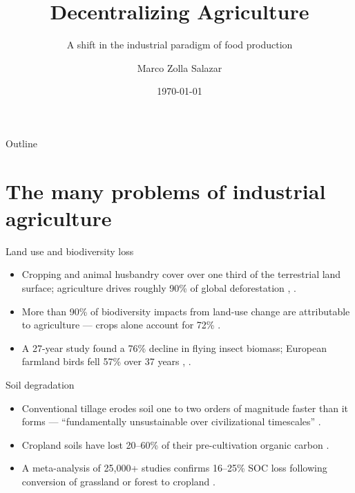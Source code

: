 \documentclass{beamer}
\title{Decentralizing Agriculture}
\subtitle{A shift in the industrial paradigm of food production}
\author{Marco Zolla Salazar}
\date{\today}
\begin{document}
\begin{frame}
    \titlepage
\end{frame}

\logo{}


\begin{frame}{Outline}
    \tableofcontents
\end{frame}


\section{The many problems of industrial agriculture}

\begin{frame}{Land use and biodiversity loss}
    \begin{itemize}
        \item Cropping and animal husbandry cover over one third of the terrestrial land surface; agriculture drives roughly 90\% of global deforestation \cite[XVI]{IPBES2019GlobalAssessment}, \cite[4]{FAO2025StateFoodAgri}. \vspace{6mm}
        \item More than 90\% of biodiversity impacts from land-use change are attributable to agriculture --- crops alone account for 72\% \cite{cabernard2024biodiversity}. \vspace{6mm}
        \item A 27-year study found a 76\% decline in flying insect biomass; European farmland birds fell 57\% over 37 years \cite{hallmann2017insect}, \cite{rigal2023farmlandbirds}.
    \end{itemize}
\end{frame}

\begin{frame}{Soil degradation}
    \begin{itemize}
        \item Conventional tillage erodes soil one to two orders of magnitude faster than it forms --- ``fundamentally unsustainable over civilizational timescales'' \cite{montgomery2007soil}. \vspace{6mm}
        \item Cropland soils have lost 20--60\% of their pre-cultivation organic carbon \cite[TS.4]{ipcc2019srccl}. \vspace{6mm}
        \item A meta-analysis of 25,000+ studies confirms 16--25\% SOC loss following conversion of grassland or forest to cropland \cite{beillouin2023soc}.
    \end{itemize}
\end{frame}
\end{document}
